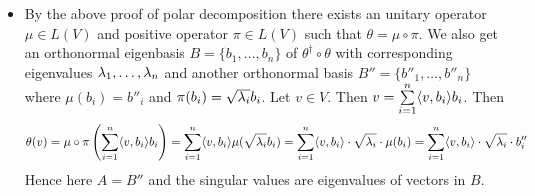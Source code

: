 \documentclass[a4paper, 11pt]{article}
\begin{document}
{\begin{itemize}[label=$\bullet$]
	Now we will show that $\mu$ is unitary and $\pi$ is positive. Now $\pi$ is diagonalizable with respect to an orthonormal eigen basis with all its eigenvalues are non-negative. Hence $\pi$ is positive. So only thing remains is to show that $\mu$ is unitary. Let for any $v\in V$, $v=\sum\limits_{i=1}^n a_ib_i$ where $a_i\in \bbC$. Then we have $$\lt\la \sum\limits_{i=1}^n a_ib_i,\sum\limits_{i=1}^n a_ib_i\rt\ra=\sum\limits_{i=1}^n |a_i|^2\la b_i,b_i\ra=\sum\limits_{i=1}^n |a_i|^2$$On the other hand we have $$\lt\la \mu\lt(\sum\limits_{i=1}^n a_ib_i\rt),\mu\lt(\sum\limits_{i=1}^n a_ib_i\rt)\rt\ra=\lt\la \sum\limits_{i=1}^n a_i\mu(b_i),\sum\limits_{i=1}^n a_i\mu(b_i)\rt\ra=\sum_{i=1}^n |a_i|^2\la b_i,b_i\ra=\sum_{i=1}^n |a_i|^2$$Hence $\mu$ is unitary. Therefore there exists an unitary operator $\mu\in L(V)$ and a positive operator $\pi\in L(V) $ such that $\theta=\mu\circ \pi$. 
	
	\item By the above proof of polar decomposition there exists an unitary operator $\mu\in L(V)$ and positive operator $\pi\in L(V)$ such that $\theta=\mu\circ \pi$. We also get an orthonormal eigenbasis $B=\{b_1,\dots, b_n\}$ of $\theta^{\dagger}\circ \theta$ with corresponding eigenvalues $\lambda_1,\dots, \lambda_n$ and another orthonormal basis $B''=\{b''_1,\dots, b''_n\}$ where $\mu(b_i)=b''_i$ and $\pi(b_i)=\sqrt{\lambda_i}b_i$. Let $v\in V$. Then $v=\sum\limits_{i=1}^n \langle v,b_i\rangle b_i$. Then $$\theta(v)=\mu\circ\pi\left(\sum\limits_{i=1}^n \langle v,b_i\rangle b_i\right)=\sum\limits_{i=1}^n \langle v,b_i\rangle \mu(\sqrt{\lambda_i}b_i)=\sum\limits_{i=1}^n \langle v,b_i\rangle\cdot\sqrt{\lambda_i}\cdot\mu(b_i)=\sum\limits_{i=1}^n \langle v,b_i\rangle\cdot\sqrt{\lambda_i} \cdot b''_i$$Hence here $A=B''$ and the singular values are eigenvalues of vectors in $B$.
\end{itemize}
}
\end{document}
